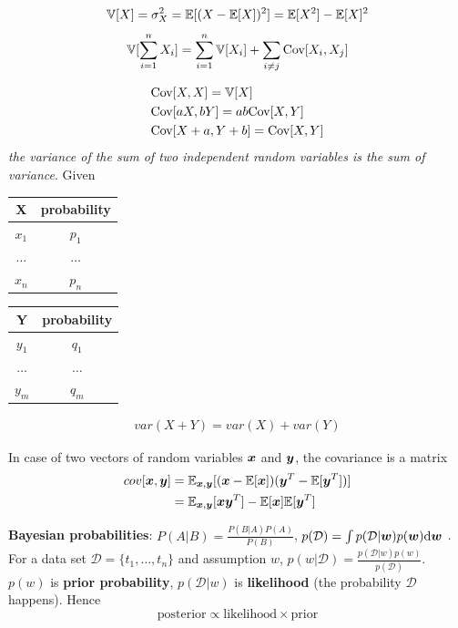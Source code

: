\documentclass[11pt]{article}
\begin{document}
\begin{equation*}
\mathbb{V}[X]=\sigma^2_X=\mathbb{E}[(X-\mathbb{E}[X])^2]=\mathbb{E}[X^2]-\mathbb{E}[X]^2
\end{equation*}
\begin{equation*}
\mathbb{V}[\displaystyle\sum_{i=1}^nX_i]=\displaystyle\sum_{i=1}^n\mathbb{V}[X_i]+
\displaystyle\sum_{i\neq j}\text{Cov}[X_i,X_j]
\end{equation*}

\begin{align*}
&\text{Cov}[X,X]=\mathbb{V}[X]\\
&\text{Cov}[aX,bY]=ab\text{Cov}[X,Y]\\
&\text{Cov}[X+a,Y+b]=\text{Cov}[X,Y]
\end{align*}
\emph{the variance of the sum of two independent random variables is the sum of}
\emph{variance}. Given
\begin{center}
\begin{tabular}{c|c}
X & probability\\
\hline
\(x_1\) & \(p_1\)\\
\(\dots\) & \(\dots\)\\
\(x_n\) & \(p_n\)\\
\end{tabular}
\end{center}

\begin{center}
\begin{tabular}{c|c}
Y & probability\\
\hline
\(y_1\) & \(q_1\)\\
\(\dots\) & \(\dots\)\\
\(y_m\) & \(q_m\)\\
\end{tabular}
\end{center}
\begin{align*}
var(X+Y)=var(X)+var(Y)
\end{align*}

In case of two vectors of random variables \(\boldsymbol{x}\) and \(\boldsymbol{y}\), the
covariance is a matrix
\begin{align*}
cov[\boldsymbol{x},\boldsymbol{y}]&=\mathbb{E}_{\boldsymbol{x},\boldsymbol{y}}[(\boldsymbol{x}-\mathbb{E}[\boldsymbol{x}])(\boldsymbol{y}^T
-\mathbb{E}[\boldsymbol{y}^T])]\\
&=\mathbb{E}_{\boldsymbol{x},\boldsymbol{y}}[\boldsymbol{xy}^T]-\mathbb{E}[\boldsymbol{x}]\mathbb{E}[\boldsymbol{y}^T]
\end{align*}

\textbf{Bayesian probabilities}: \(P(A|B)=\frac{P(B|A)P(A)}{P(B)}\),
\(p(\mathcal{D})=\int p(\mathcal{D}|\boldsymbol{w})p(\boldsymbol{w})\text{d}\boldsymbol{w}\)
. For a data set 
\(\mathcal{D}=\{t_1,\dots,t_n\}\) and assumption \(w\),
\(p(w|\mathcal{D})=\frac{p(\mathcal{D}|w)p(w)}{p(\mathcal{D})}\). \(p(w)\) is
\textbf{prior probability}, \(p(\mathcal{D}|w)\) is \textbf{likelihood} (the probability
\(\mathcal{D}\) happens). Hence 
\begin{equation*}
\text{posterior}\propto\text{likelihood}\times\text{prior}
\end{equation*}
\end{document}
